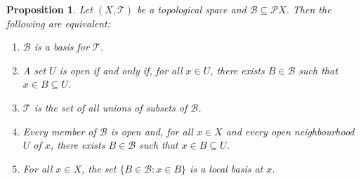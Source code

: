 \documentclass{report}
\newtheorem{prop}[lm]{Proposition}
\theoremstyle{definition}
\begin{document}
  \begin{prop}
    \label{prop:topology:basis:open}
    Let $(X, \mathcal{T})$ be a topological space and $\mathcal{B} \subseteq
    \mathcal{P} X$. Then the following are equivalent:
    \begin{enumerate}
      \item $\mathcal{B}$ is a basis for $\mathcal{T}$.
      \item A set $U$ is open if and only if, for all $x \in U$, there exists
      $B \in \mathcal{B}$ such that $x \in B \subseteq U$.
      \item $\mathcal{T}$ is the set of all unions of subsets of $\mathcal{B}$.
      \item Every member of $\mathcal{B}$ is open and, for all $x \in X$
      and every open neighbourhood $U$ of $x$, there exists $B \in \mathcal{B}$
      such that $x \in B \subseteq U$.
      \item For all $x \in X$, the set $\{ B \in \mathcal{B} : x \in B \}$ is a
      local basis at $x$.
    \end{enumerate}
  \end{prop}
\end{document}
